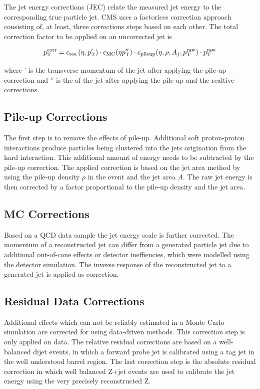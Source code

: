 The jet energy corrections (JEC) relate the measured jet energy to the
corresponding true particle jet. CMS uses a factorices correction approach
consisting of, at least, three corrections steps based on each other. The total
correction factor to be applied on an uncorrected jet is

\begin{equation}
    p_{\mathrm{T}}^{\mathrm{corr}} = c_{\mathrm{res.}} (\eta, p_{\mathrm{T}}') \cdot c_{\mathrm{MC}}
    (\eta p_{\mathrm{T}}'') \cdot c_{\mathrm{pileup}}(\eta, \rho, A_j, p_{\mathrm{T}}^{\mathrm{raw}}) \cdot p_{\mathrm{T}}^{\mathrm{raw}} 
\end{equation}

where \pt' is the transverse momentum of the jet after applying the pile-up
correction and \pt'' is the \pt of the jet after applying the pile-up and the
realtive corrections.

\subsection{Pile-up Corrections}

The first step is to remove the effects of pile-up. Additional soft proton-proton
interactions produce particles being clustered into the jets origination from
the hard interaction. This additional amount of energy needs to be subtracted by
the pile-up correction. The applied correction is based on the jet area method
by using the pile-up density $\rho$ in the event and the jet area $A$. The raw
jet energy is then corrected by a factor proportional to the pile-up density and
the jet area.

\subsection{MC Corrections}

Based on a QCD data sample the jet energy scale is further corrected. The
momentum of a reconstructed jet can differ from a generated particle jet due to
additional out-of-cone effects or detector ineffiencies, which were modelled
using the detector simulation. The inverse response of the reconstructed jet to
a generated jet is applied as correction.

\subsection{Residual Data Corrections}

Additional effects which can not be reliably estimated in a Monte Carlo
simulation are corrected for using data-driven methods. This correction step is
only applied on data. The relative residual corrections are based on a
well-balanced dijet events, in which a forward probe jet is calibrated using a
tag jet in the well understood barrel region. The last correction step is the
absolute residual correction in which well balanced Z+jet events are used to
calibrate the jet energy using the very precisely reconstructed Z.

